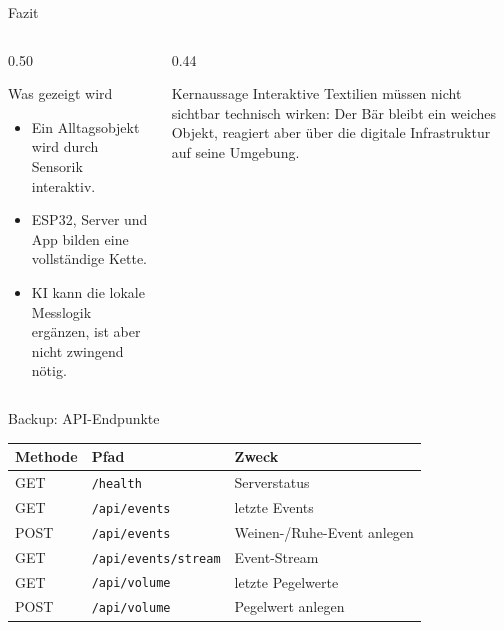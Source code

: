 \documentclass[aspectratio=169,11pt]{beamer}
\newcommand{\apiendpoint}[1]{\texttt{#1}}
\begin{document}
\begin{frame}{Fazit}
  \begin{columns}[T,totalwidth=\textwidth]
    \begin{column}{0.50\textwidth}
      \begin{block}{Was gezeigt wird}
        \begin{itemize}
          \item Ein Alltagsobjekt wird durch Sensorik interaktiv.
          \item ESP32, Server und App bilden eine vollständige Kette.
          \item KI kann die lokale Messlogik ergänzen, ist aber nicht zwingend nötig.
        \end{itemize}
      \end{block}
    \end{column}
    \begin{column}{0.44\textwidth}
      \begin{block}{Kernaussage}
        Interaktive Textilien müssen nicht sichtbar technisch wirken:
        Der Bär bleibt ein weiches Objekt, reagiert aber über die digitale
        Infrastruktur auf seine Umgebung.
      \end{block}
    \end{column}
  \end{columns}
\end{frame}

\appendix
\begin{frame}{Backup: API-Endpunkte}
  \begin{tabular}{lll}
    \toprule
    Methode & Pfad & Zweck\\
    \midrule
    GET & \apiendpoint{/health} & Serverstatus\\
    GET & \apiendpoint{/api/events} & letzte Events\\
    POST & \apiendpoint{/api/events} & Weinen-/Ruhe-Event anlegen\\
    GET & \apiendpoint{/api/events/stream} & Event-Stream\\
    GET & \apiendpoint{/api/volume} & letzte Pegelwerte\\
    POST & \apiendpoint{/api/volume} & Pegelwert anlegen\\
    \bottomrule
  \end{tabular}
\end{frame}
\end{document}

